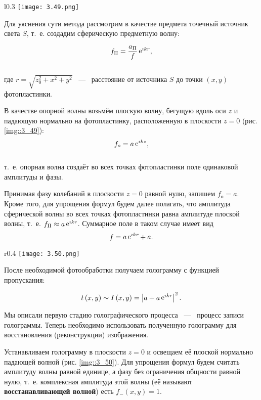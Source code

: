 \begin{wrapfigure}{l}{0.3\linewidth}
  \texttt{[image: 3.49.png]}
  \caption{Запись голограммы точечного источника}
  \label{img::3_49}
\end{wrapfigure}

Для уяснения сути метода рассмотрим в качестве предмета точечный источник света $S$, т.~е. создадим сферическую предметную волну:

$$
f_{\Pi} = \frac{a_{\Pi}}{f} \mathop{\mathrm e}\nolimits^{\imath kr},
$$\\
где $r = \sqrt{z_0^2 + x^2 + y^2}$ ~---~ расстояние от источника $S$ до точки $\left( x, y \right)$ фотопластинки. 

В качестве опорной волны возьмём плоскую волну, бегущую вдоль оси $z$ и падающую нормально на фотопластинку, расположенную в плоскости 
$z = 0$ (рис. \ref{img::3_49}):
$$
f_o = a \mathop{\mathrm e}\nolimits^{\imath kz},
$$\\
т.~е. опорная волна создаёт во всех точках фотопластинки поле одинаковой амплитуды и фазы.

Принимая фазу колебаний в плоскости $z = 0$ равной нулю, запишем $f_о = a$. 
Кроме того, для упрощения формул будем далее полагать, что амплитуда сферической волны во всех точках фотопластинки равна амплитуде плоской волны, 
т.~е. $f_{\Pi} \approx a\mathop{\mathrm e}\nolimits^{\imath kr}$. Суммарное поле в таком случае имеет вид
$$
f = a\mathop{\mathrm e}\nolimits^{\imath kr} + \: a.
$$
\newpage
\begin{wrapfigure}{r}{0.4\linewidth}
  \texttt{[image: 3.50.png]}
  \caption{Восстановление голограммы точечного источника}
  \label{img::3_50}
\end{wrapfigure}
После необходимой фотообработки получаем голограмму с
функцией пропускания:

\begin{equation}\label{eq::3.83}
t\left(x, y\right) \sim I\left(x, y\right)  = 
\left|a +  a\mathop{\mathrm e}\nolimits^{\imath kr}\right|^2.
\end{equation}

Мы описали первую стадию голографического процесса ~---~ процесс записи голограммы.
Теперь необходимо использовать полученную голограмму для восстановления (реконструкции) изображения.

Устанавливаем голограмму в плоскости $z = 0$ и освещаем её плоской нормально падающей волной (рис. \ref{img::3_50}). Для упрощения формул
будем считать амплитуду волны равной единице, а фазу без ограничения общности равной нулю, т.~е. комплексная амплитуда этой волны (её
называют \textbf{восстанавливающей волной}) есть $f_-(x,y) = 1$.

